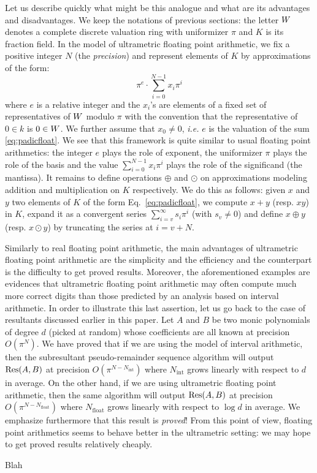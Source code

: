 \documentclass{sig-alternate}
\begin{document}
\medskip

Let us describe quickly what might be this analogue and what are its
advantages and disadvantages. We keep the notations of previous
sections: the letter $W$ denotes a complete discrete valuation ring
with uniformizer $\pi$ and $K$ is its fraction field.
In the model of ultrametric floating point arithmetic, we fix a
positive integer $N$ (the \emph{precision}) and represent elements 
of $K$ by approximations of the form:
\begin{equation}
\label{eq:padicfloat}
\pi^e \cdot \sum_{i=0}^{N-1} x_i \pi^i
\end{equation}
where $e$ is a relative integer and the $x_i$'s are elements of a fixed 
set of representatives of $W$ modulo $\pi$ with the convention that the 
representative of $0 \in k$ is $0 \in W$.
We further assume that $x_0 \neq 0$, \emph{i.e.} $e$ is the valuation
of the sum \eqref{eq:padicfloat}. We see that this framework is quite
similar to usual floating point arithmetics: the integer $e$ plays the
role of exponent, the uniformizer $\pi$ plays the role of the basis
and the value $\sum_{i=0}^{N-1} x_i \pi^i$ plays the role of the
significand (the mantissa). It remains to define operations $\oplus$
and $\odot$ on approximations modeling addition and multiplication
on $K$ respectively. We do this as follows: given $x$ and $y$ two
elements of $K$ of the form Eq.~\eqref{eq:padicfloat}, we compute
$x+y$ (resp. $xy$) in $K$, expand it as a convergent series 
$\sum_{i=v}^{\infty} s_i \pi^i$ (with $s_v \neq 0$) and define $x 
\oplus y$ (resp. $x \odot y$) by truncating the series at $i = v+N$.

Similarly to real floating point arithmetic, the main advantages of 
ultrametric floating point arithmetic are the simplicity and the 
efficiency and the counterpart is the difficulty to get proved results. 
Moreover, the aforementioned examples are evidences that ultrametric 
floating point arithmetic may often compute much more correct digits 
than those predicted by an analysis based on interval arithmetic. In 
order to illustrate this last assertion, let us go back to the case of 
resultants discussed earlier in this paper. Let $A$ and $B$ be two monic 
polynomials of degree $d$ (picked at random) whose coefficients are all 
known at precision $O(\pi^N)$. We have proved that if we are using the
model of interval arithmetic, then the subresultant pseudo-remainder
sequence algorithm will output $\text{\rm Res}(A,B)$ at precision 
$O(\pi^{N-N_{\text{int}}})$ where $N_{\text{int}}$ grows linearly 
with respect to $d$ in average. On the other hand, if we are using 
ultrametric floating point arithmetic, then the same algorithm will
output $\text{\rm Res}(A,B)$ at precision $O(\pi^{N-N_{\text{float}}})$ where 
$N_{\text{float}}$ grows linearly with respect to $\log d$ in average.
We emphasize furthermore that this result is \emph{proved}! From this
point of view, floating point arithmetics seems to behave better in
the ultrametric setting: we may hope to get proved results relatively
cheaply.

\begin{thebibliography}{99}
  Blah
\end{thebibliography}
\end{document}
